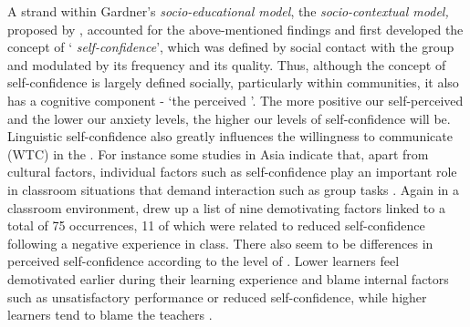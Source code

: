 \documentclass[output=paper]{langsci/langscibook}
\begin{document}
A strand within Gardner’s \textit{socio-educational model}, the \textit{socio-contextual model,} proposed by \citet{Clément1980}, accounted for the above-mentioned findings and first developed the concept of ‘\textit{ self-confidence}’, which was defined by social contact with the  group and modulated by its  frequency and its quality. Thus, although the concept of  self-confidence is largely defined socially, particularly within  communities, it also has a cognitive component - ‘the perceived  ’. The more positive our self-perceived  and the lower our anxiety levels, the higher our levels of  self-confidence will be. Linguistic self-confidence also greatly influences the willingness to communicate (WTC) in the  \citep{MacIntyre1EtAl998}.  For instance some studies in Asia indicate that, apart from cultural factors, individual factors such as self-confidence play an important role in classroom situations that demand interaction such as group tasks \citep{ShaoGao2016,Eddy-U2015,Yashima2002}. Again in a classroom environment, \citet{Dörnyei2001} drew up a list of nine demotivating factors linked to a total of 75 occurrences, 11 of which  were related to reduced self-confidence following a negative experience in class. There also seem to be differences in perceived self-confidence according to the level of . Lower  learners feel demotivated earlier during their learning experience and blame internal factors such as unsatisfactory performance or reduced self-confidence, while higher  learners tend to blame the teachers \citep{FaloutMaruyama2004}. 
\end{document}
